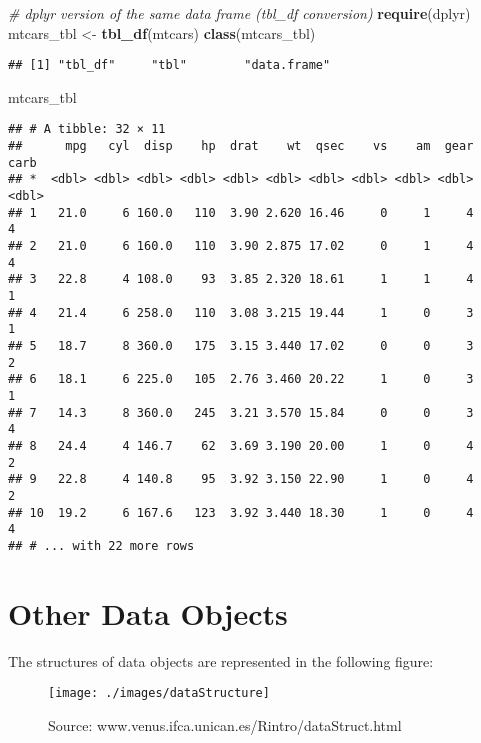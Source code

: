 \documentclass[]{book}
\newenvironment{Shaded}{\begin{snugshade}}{\end{snugshade}}
\newcommand{\KeywordTok}[1]{\textcolor[rgb]{0.13,0.29,0.53}{\textbf{{#1}}}}
\newcommand{\StringTok}[1]{\textcolor[rgb]{0.31,0.60,0.02}{{#1}}}
\newcommand{\CommentTok}[1]{\textcolor[rgb]{0.56,0.35,0.01}{\textit{{#1}}}}
\newcommand{\NormalTok}[1]{{#1}}
\begin{document}
\begin{Shaded}
\begin{Highlighting}[]
\CommentTok{# dplyr version of the same data frame (tbl_df conversion)}
\KeywordTok{require}\NormalTok{(dplyr)}
\NormalTok{mtcars_tbl <-}\StringTok{ }\KeywordTok{tbl_df}\NormalTok{(mtcars)}
\KeywordTok{class}\NormalTok{(mtcars_tbl)}
\end{Highlighting}
\end{Shaded}

\begin{verbatim}
## [1] "tbl_df"     "tbl"        "data.frame"
\end{verbatim}

\begin{Shaded}
\begin{Highlighting}[]
\NormalTok{mtcars_tbl}
\end{Highlighting}
\end{Shaded}

\begin{verbatim}
## # A tibble: 32 × 11
##      mpg   cyl  disp    hp  drat    wt  qsec    vs    am  gear  carb
## *  <dbl> <dbl> <dbl> <dbl> <dbl> <dbl> <dbl> <dbl> <dbl> <dbl> <dbl>
## 1   21.0     6 160.0   110  3.90 2.620 16.46     0     1     4     4
## 2   21.0     6 160.0   110  3.90 2.875 17.02     0     1     4     4
## 3   22.8     4 108.0    93  3.85 2.320 18.61     1     1     4     1
## 4   21.4     6 258.0   110  3.08 3.215 19.44     1     0     3     1
## 5   18.7     8 360.0   175  3.15 3.440 17.02     0     0     3     2
## 6   18.1     6 225.0   105  2.76 3.460 20.22     1     0     3     1
## 7   14.3     8 360.0   245  3.21 3.570 15.84     0     0     3     4
## 8   24.4     4 146.7    62  3.69 3.190 20.00     1     0     4     2
## 9   22.8     4 140.8    95  3.92 3.150 22.90     1     0     4     2
## 10  19.2     6 167.6   123  3.92 3.440 18.30     1     0     4     4
## # ... with 22 more rows
\end{verbatim}

\section{Other Data Objects}\label{other-data-objects}

The structures of data objects are represented in the following figure:

\begin{figure}[h]
\texttt{[image: ./images/dataStructure]} \caption{Source:  www.venus.ifca.unican.es/Rintro/dataStruct.html}\label{fig:g1}
\end{figure}
\end{document}
